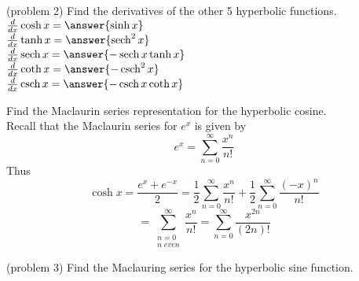 \documentclass[handout]{ximera}
\begin{document}
\begin{problem}(problem 2)
Find the derivatives of the other 5 hyperbolic functions.\\
$\frac{d}{dx} \cosh x = \answer{\sinh x}$\\
$\frac{d}{dx} \tanh x = \answer{\sech^2 x}$\\
$\frac{d}{dx} \sech x = \answer{-\sech x \tanh x}$\\
$\frac{d}{dx} \coth x = \answer{-\csch^2 x}$\\
$\frac{d}{dx} \csch x = \answer{-\csch x \coth x}$
\end{problem}


\begin{example}[example 3]
Find the Maclaurin series representation for the hyperbolic cosine.\\
Recall that the Maclaurin series for $e^x$ is given by
\[
e^x = \sum_{n=0}^\infty \frac{x^n}{n!}
\]
Thus
\[
\cosh x = \frac{e^x + e^{-x}}{2} = \frac12 \sum_{n=0}^\infty \frac{x^n}{n!} + \frac12 \sum_{n=0}^\infty \frac{(-x)^n}{n!}
\]
\[
= \sum_{\substack{n=0\\ n\; even}}^\infty \frac{x^n}{n!} = \sum_{n=0}^\infty \frac{x^{2n}}{(2n)!}
\]

\end{example}

\begin{problem}(problem 3)
Find the Maclauring series for the hyperbolic sine function.\\

\begin{multipleChoice}
\end{multipleChoice}
\end{problem}
\end{document}
